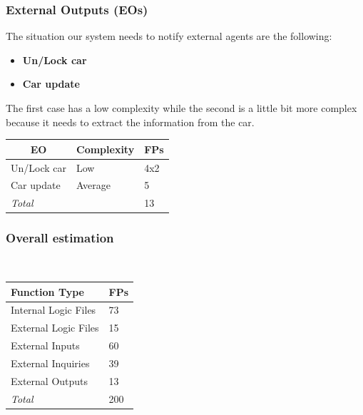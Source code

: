 \documentclass[english]{article}
\begin{document}
\subsubsection{External Outputs (EOs)}

The situation our system needs to notify external agents are the following:

\begin{itemize}
	\item{\textbf{Un/Lock car}}

	\item{\textbf{Car update}}
\end{itemize}

The first case has a low complexity while the second is a little bit more complex because it needs to extract the information from the car.

\begin{center}
	\begin{tabular}{ |p{8cm}|m{2cm}|p{1cm}| }
		\hline
		\multicolumn{1}{|c|}{\textbf{EO}} & \multicolumn{1}{c|}{\textbf{Complexity}} & \multicolumn{1}{c|}{\textbf{FPs}} \\
		\hline
		Un/Lock car & Low & 4x2 \\
		\hline
		Car update & Average & 5\\
		\hline
		\multicolumn{2}{|l|}{\textit{Total}} & \multicolumn{1}{l|}{13}\\
		\hline
	\end{tabular}
\end{center}

\subsubsection{Overall estimation}

\\
\begin{center}
	\begin{tabular}{|p{5cm}|p{1cm}|}
		\hline
		\textbf{Function Type} & \textbf{FPs} \\
		\hline
		Internal Logic Files & 73 \\
		External Logic Files & 15 \\
		External Inputs & 60 \\
		External Inquiries & 39 \\
		External Outputs & 13 \\
		\hline
		\textit{Total} & 200 \\
		\hline
	\end{tabular}
\end{center}
\end{document}
